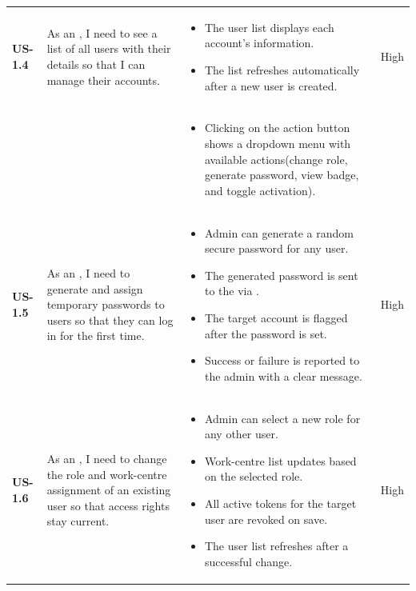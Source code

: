 \begin{longtable}{p{1.5cm} p{5cm} p{6.5cm} p{2cm}}
	\textbf{US-1.4} &
	As an \userrole{Administrator}, I need to see a list of all
	users with their details so that I can manage their accounts.
	& \begin{itemize}[nosep, leftmargin=*]
	\item The user list displays each account's information.
	\item The list refreshes automatically after a new user is created.
	\end{itemize} & High \\ & &
	\begin{itemize}[nosep, leftmargin=*]
	\item Clicking on the action button shows a dropdown menu with available actions(change role, generate password, view badge, and toggle activation).
	\end{itemize} & \\ \midrule

	\textbf{US-1.5} &
	As an \userrole{Administrator}, I need to generate and assign temporary
	passwords to users so that they can log in for the first time.
	& \begin{itemize}[nosep, leftmargin=*]
	\item Admin can generate a random secure password for any user.
	\item The generated password is sent to the \techname{MES} via \techname{AdminSetPassword}.
	\item The target account is flagged \domainterm{Need To Change Password} after the password is set.
	\item Success or failure is reported to the admin with a clear message.
	\end{itemize} & High \\ \midrule

	\textbf{US-1.6} &
	As an \userrole{Administrator}, I need to change the role and work-centre
	assignment of an existing user so that access rights stay current.
	&
	\begin{itemize}[nosep, leftmargin=*]
	\item Admin can select a new role for any other user.
	\item Work-centre list updates based on the selected role.
	\item All active tokens for the target user are revoked on save.
	\item The user list refreshes after a successful change.
	\end{itemize}
	&
	High \\ \midrule


\end{longtable}
